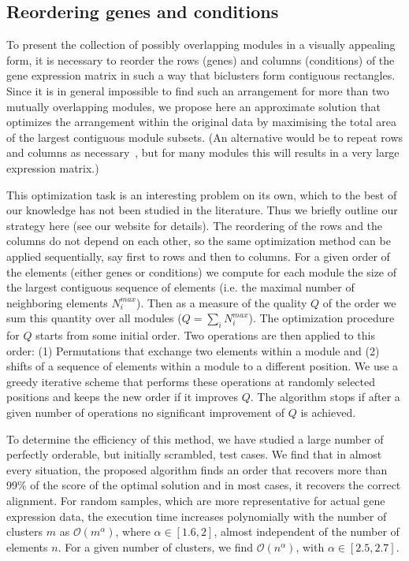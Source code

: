 \documentclass[round]{bioinfo}
\begin{document}
\subsection{Reordering genes and conditions}
To present the collection of possibly overlapping modules in a visually
appealing form, it is necessary to reorder the rows (genes) and
columns (conditions) of the
gene expression matrix in such a way that biclusters form contiguous
rectangles. Since it is in general impossible to find such an
arrangement for more than two mutually overlapping modules, we propose
here an approximate solution that optimizes the arrangement within the
original data by maximising the total area of the largest contiguous
module subsets. (An alternative would be to repeat rows and columns as
necessary~\cite{grothaus06}, but for many modules this will results in
a very large expression matrix.) 

This optimization task is an interesting problem on its own, which to
the best of our knowledge has not been studied in the literature. Thus
we briefly outline our strategy here (see our website for details). 
The reordering of the rows and the columns do not depend on each
other, so the same optimization method can be applied sequentially,
say first to rows and then to columns. For a given order of the
elements (either genes or conditions) we compute for each module the
size of the largest contiguous sequence of elements (i.e. the maximal
number of neighboring elements $N^{max}_i$). Then as a measure of the
quality $Q$ of the order we sum this quantity over all modules
($Q=\sum_i N^{max}_i$). The optimization procedure for $Q$ starts from
some initial order. Two operations are then applied to this order: (1)
Permutations that exchange two elements within a module and (2) shifts
of a sequence of elements within a module to a different position. We
use a greedy iterative scheme that performs these operations at
randomly selected positions and keeps the new order if it improves
$Q$. The algorithm stops if after a given number of operations no
significant improvement of $Q$ is achieved. 

To determine the efficiency of this method, we have studied a large
number of perfectly orderable, but initially scrambled, test cases. We
find that in almost every situation, the proposed algorithm finds an
order that recovers more than 99\% of the score of the optimal
solution and in most cases, it recovers the correct
alignment. For random samples, which are more representative for
actual gene expression data, the execution time increases polynomially
with the number of clusters $m$ as ${\mathcal O}(m^\alpha)$, where
$\alpha \in [1.6, 2]$, almost independent of the number of elements
$n$. For a given number of clusters, we find ${\mathcal O}(n^\alpha)$,
with $\alpha \in [2.5, 2.7]$. 
\end{document}
